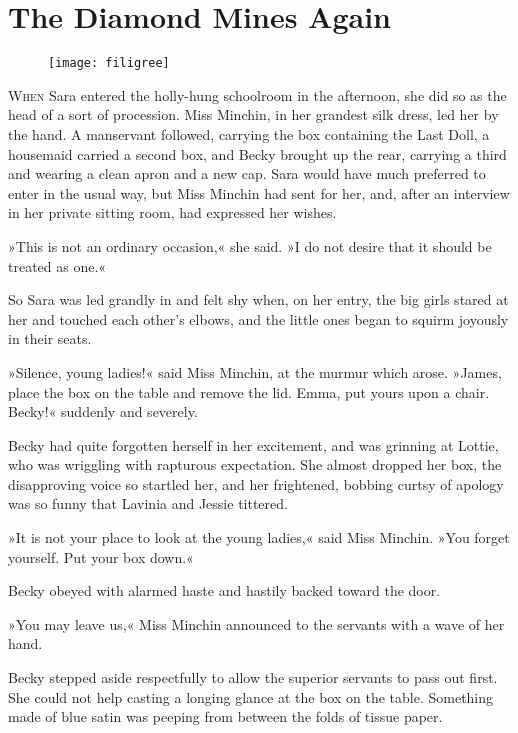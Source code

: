 \chapter{The Diamond Mines Again}

\begin{figure}[t!]
\centering
\texttt{[image: filigree]}
\end{figure}

\lettrine[lines=5]{W}{hen} Sara entered the holly-hung schoolroom in the afternoon, she did so as the head of a sort of procession. Miss Minchin, in her grandest silk dress, led her by the hand. A manservant followed, carrying the box containing the Last Doll, a housemaid carried a second box, and Becky brought up the rear, carrying a third and wearing a clean apron and a new cap. Sara would have much preferred to enter in the usual way, but Miss Minchin had sent for her, and, after an interview in her private sitting room, had expressed her wishes.

»This is not an ordinary occasion,« she said. »I do not desire that it should be treated as one.«

So Sara was led grandly in and felt shy when, on her entry, the big girls stared at her and touched each other's elbows, and the little ones began to squirm joyously in their seats.

»Silence, young ladies!« said Miss Minchin, at the murmur which arose. »James, place the box on the table and remove the lid. Emma, put yours upon a chair. Becky!« suddenly and severely.

Becky had quite forgotten herself in her excitement, and was grinning at Lottie, who was wriggling with rapturous expectation. She almost dropped her box, the disapproving voice so startled her, and her frightened, bobbing curtsy of apology was so funny that Lavinia and Jessie tittered.

»It is not your place to look at the young ladies,« said Miss Minchin. »You forget yourself. Put your box down.«

Becky obeyed with alarmed haste and hastily backed toward the door.

»You may leave us,« Miss Minchin announced to the servants with a wave of her hand.

Becky stepped aside respectfully to allow the superior servants to pass out first. She could not help casting a longing glance at the box on the table. Something made of blue satin was peeping from between the folds of tissue paper.

